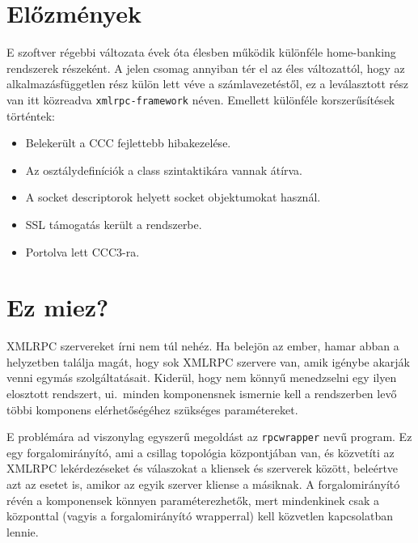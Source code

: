 

\section{Előzmények}

E szoftver régebbi változata évek óta élesben működik különféle 
home-banking rendszerek részeként. A jelen csomag annyiban tér el
az éles változattól, hogy
az alkalmazásfüggetlen rész külön lett véve a számlavezetéstől,
ez a leválasztott rész van itt közreadva {\tt xmlrpc-framework} néven.
Emellett különféle korszerűsítések történtek:

\begin{itemize}
 \item Belekerült a CCC fejlettebb hibakezelése.
 \item Az osztálydefiníciók a class szintaktikára vannak átírva.
 \item A socket descriptorok helyett socket objektumokat használ.
 \item SSL támogatás került a rendszerbe.
 \item Portolva lett CCC3-ra.
\end{itemize}
  


\section{Ez miez?}

XMLRPC szervereket írni nem túl nehéz. 
Ha belejön az ember, hamar abban a helyzetben találja magát,
hogy sok XMLRPC szervere van, amik  igénybe akarják venni 
egymás szolgáltatásait. Kiderül, hogy nem könnyű menedzselni
egy ilyen elosztott rendszert, ui.\ minden komponensnek ismernie
kell a rendszerben levő többi komponens elérhetőségéhez
szükséges paramétereket. 

E problémára ad viszonylag egyszerű megoldást az {\tt rpcwrapper}
nevű program. Ez egy forgalomirányító, ami a csillag topológia
központjában van, és közvetíti az XMLRPC lekérdezéseket és válaszokat
a kliensek és szerverek között, beleértve azt az esetet is, amikor
az egyik szerver kliense a másiknak. A forgalomirányító révén
a komponensek könnyen paraméterezhetők, mert mindenkinek csak
a központtal (vagyis a forgalomirányító wrapperral) kell 
közvetlen kapcsolatban lennie.

